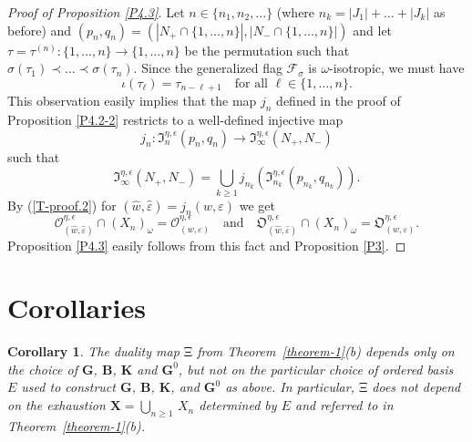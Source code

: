 \documentclass{amsart}
\newtheorem{corollary}{Corollary}
\theoremstyle{definition}
\newcommand{\bs}[1]{\boldsymbol{#1}}
\begin{document}
\begin{proof}[Proof of Proposition \ref{P4.3}]
Let $n\in\{n_1,n_2,\ldots\}$ (where $n_k=|J_1|+\ldots+|J_k|$ as before) and $(p_n,q_n)=(|N_+\cap\{1,\ldots,n\}|,|N_-\cap\{1,\ldots,n\}|)$
and let $\tau=\tau^{(n)}:\{1,\ldots,n\}\to\{1,\ldots,n\}$
be the permutation such that $\sigma(\tau_1)\prec\ldots\prec\sigma(\tau_n)$.
Since the generalized flag $\mathcal{F}_\sigma$ is $\omega$-isotropic,
we must have
\[\iota(\tau_\ell)=\tau_{n-\ell+1}\quad\mbox{for all $\ell\in\{1,\ldots,n\}$}.\]
This observation easily implies that the map $j_n$ defined in the proof 
of Proposition \ref{P4.2-2}
restricts to a well-defined injective map 
\[j_n:\mathfrak{I}^{\eta,\epsilon}_n(p_n,q_n)\to \mathfrak{I}^{\eta,\epsilon}_\infty(N_+,N_-)\]
such that
\[\mathfrak{I}^{\eta,\epsilon}_\infty(N_+,N_-)=\bigcup_{k\geq 1}
j_{n_k}(\mathfrak{I}^{\eta,\epsilon}_{n_k}(p_{n_k},q_{n_k})).\]
By (\ref{T-proof.2}) for $(\hat{w},\hat{\varepsilon})=j_n(w,\varepsilon)$ we get
\begin{equation}
\label{T-proof.3}
\bs{\mathcal{O}}^{\eta,\epsilon}_{(\hat{w},\hat{\varepsilon})}\cap (X_{n})_\omega=\mathcal{O}^{\eta,\epsilon}_{(w,\varepsilon)}
\quad
\mbox{and}
\quad
\bs{\mathfrak{O}}^{\eta,\epsilon}_{(\hat{w},\hat{\varepsilon})}\cap (X_{n})_\omega=\mathfrak{O}^{\eta,\epsilon}_{(w,\varepsilon)}.
\end{equation}
Proposition \ref{P4.3} easily follows from this fact and Proposition \ref{P3}.
\end{proof}



\section{Corollaries}

\label{S5}

\begin{corollary}
The duality map $\mathrm{\Xi}$ from Theorem~\ref{theorem-1}(b) depends only on the choice of $\mathbf{G}$, $\mathbf{B}$, $\mathbf{K}$ and $\mathbf{G}^0$, but not on the particular choice of ordered basis $E$ used to construct $\mathbf{G}$, $\mathbf{B}$, $\mathbf{K}$, and $\mathbf{G}^0$ as above.  In particular, $\mathrm{\Xi}$ does not depend on the exhaustion $\mathbf{X}=\bigcup_{n\geq 1}\,X_n$ determined by $E$ and referred to in Theorem~\ref{theorem-1}(b).
\end{corollary}
\end{document}
